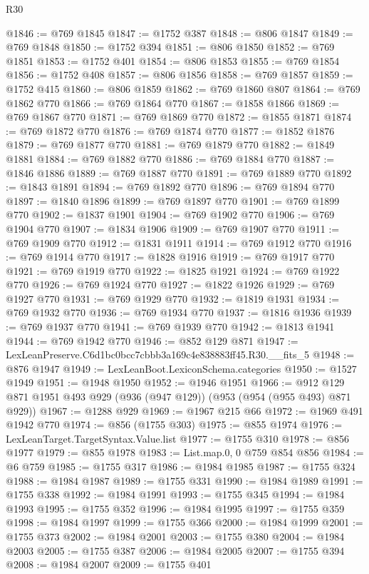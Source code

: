\begin{lexlean}{R30}
\begin{coremodule}
@1846 := @769 @1845
@1847 := @1752 @387
@1848 := @806 @1847
@1849 := @769 @1848
@1850 := @1752 @394
@1851 := @806 @1850
@1852 := @769 @1851
@1853 := @1752 @401
@1854 := @806 @1853
@1855 := @769 @1854
@1856 := @1752 @408
@1857 := @806 @1856
@1858 := @769 @1857
@1859 := @1752 @415
@1860 := @806 @1859
@1862 := @769 @1860 @807
@1864 := @769 @1862 @770
@1866 := @769 @1864 @770
@1867 := @1858 @1866
@1869 := @769 @1867 @770
@1871 := @769 @1869 @770
@1872 := @1855 @1871
@1874 := @769 @1872 @770
@1876 := @769 @1874 @770
@1877 := @1852 @1876
@1879 := @769 @1877 @770
@1881 := @769 @1879 @770
@1882 := @1849 @1881
@1884 := @769 @1882 @770
@1886 := @769 @1884 @770
@1887 := @1846 @1886
@1889 := @769 @1887 @770
@1891 := @769 @1889 @770
@1892 := @1843 @1891
@1894 := @769 @1892 @770
@1896 := @769 @1894 @770
@1897 := @1840 @1896
@1899 := @769 @1897 @770
@1901 := @769 @1899 @770
@1902 := @1837 @1901
@1904 := @769 @1902 @770
@1906 := @769 @1904 @770
@1907 := @1834 @1906
@1909 := @769 @1907 @770
@1911 := @769 @1909 @770
@1912 := @1831 @1911
@1914 := @769 @1912 @770
@1916 := @769 @1914 @770
@1917 := @1828 @1916
@1919 := @769 @1917 @770
@1921 := @769 @1919 @770
@1922 := @1825 @1921
@1924 := @769 @1922 @770
@1926 := @769 @1924 @770
@1927 := @1822 @1926
@1929 := @769 @1927 @770
@1931 := @769 @1929 @770
@1932 := @1819 @1931
@1934 := @769 @1932 @770
@1936 := @769 @1934 @770
@1937 := @1816 @1936
@1939 := @769 @1937 @770
@1941 := @769 @1939 @770
@1942 := @1813 @1941
@1944 := @769 @1942 @770
@1946 := @852 @129 @871
@1947 := LexLeanPreserve.C6d1bc0bcc7cbbb3a169c4e838883ff45.R30.__fits_5
@1948 := @876 @1947
@1949 := LexLeanBoot.LexiconSchema.categories
@1950 := @1527 @1949
@1951 := @1948 @1950
@1952 := @1946 @1951
@1966 := @912 @129 @871 @1951 @493 @929 (@936 (@947 @129)) (@953 (@954 (@955 @493) @871 @929))
@1967 := @1288 @929
@1969 := @1967 @215 @66
@1972 := @1969 @491 @1942 @770
@1974 := @856 (@1755 @303)
@1975 := @855 @1974
@1976 := LexLeanTarget.TargetSyntax.Value.list
@1977 := @1755 @310
@1978 := @856 @1977
@1979 := @855 @1978
@1983 := List.map.{0, 0} @759 @854 @856
@1984 := @6 @759
@1985 := @1755 @317
@1986 := @1984 @1985
@1987 := @1755 @324
@1988 := @1984 @1987
@1989 := @1755 @331
@1990 := @1984 @1989
@1991 := @1755 @338
@1992 := @1984 @1991
@1993 := @1755 @345
@1994 := @1984 @1993
@1995 := @1755 @352
@1996 := @1984 @1995
@1997 := @1755 @359
@1998 := @1984 @1997
@1999 := @1755 @366
@2000 := @1984 @1999
@2001 := @1755 @373
@2002 := @1984 @2001
@2003 := @1755 @380
@2004 := @1984 @2003
@2005 := @1755 @387
@2006 := @1984 @2005
@2007 := @1755 @394
@2008 := @1984 @2007
@2009 := @1755 @401

\end{coremodule}
\end{lexlean}
